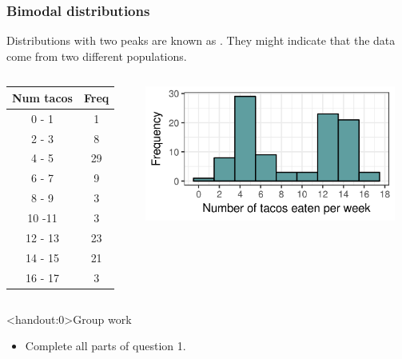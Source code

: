 \documentclass[xcolor=table, aspectratio=169, bigger]{beamer}
\begin{document}
\begin{frame}
\frametitle{Bimodal distributions}
\begin{block}{}
Distributions with two peaks are known as . They might indicate that the data come from two different populations.
\end{block}
\pause
\begin{columns}
\begin{column}{0.35\textwidth}
\begin{exampleblock}{}
\begin{center}
\begin{tabular}{cc}
Num tacos & Freq \\
\hline
0 - 1 & 1 \\
2 - 3 & 8 \\
4 - 5 & 29 \\
6 - 7 & 9 \\
8 - 9 & 3 \\
10 -11 & 3 \\
12 - 13 & 23 \\
14 - 15 & 21 \\
16 - 17 & 3 \\
\end{tabular}
\end{center}
\end{exampleblock}
\end{column}
\pause
\begin{column}{0.65\textwidth}
\begin{center}
\includegraphics[width=3.25in]{../images/wk04_taco_bi_hist}

\end{center}
\end{column}
\end{columns}
\end{frame}

\begin{frame}<handout:0>{Group work}
\begin{block}{}
\begin{itemize}
\item Complete all parts of question 1.
\end{itemize}
\end{block}
\end{frame}
\end{document}
